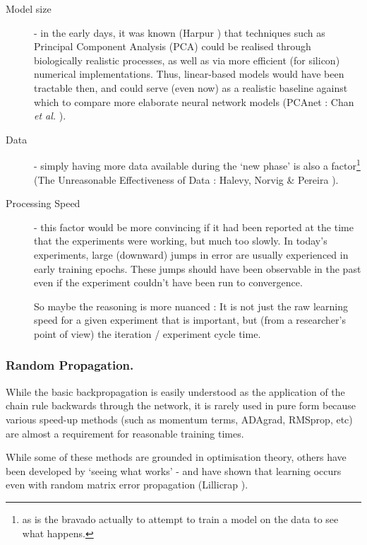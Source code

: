 \documentclass[citeauthoryear]{llncs}
\begin{document}
\begin{description}

\item[Model size] - in the early days, it was known (Harpur \cite{harpur-thesis}) 
that techniques such as Principal Component Analysis (PCA) could be realised  
through biologically realistic processes, as well as via more efficient (for silicon) numerical implementations.  
Thus, linear-based models would have been tractable then, 
and could serve (even now) as a realistic baseline against which to compare 
more elaborate neural network models (PCAnet : Chan \emph{et al.} \cite{PCAnet}).

\item[Data] - simply having more data available during the `new phase' 
is also a factor\footnote{as is the bravado actually to attempt to train a model on the data to see what happens.}
(The Unreasonable Effectiveness of Data : Halevy, Norvig \& Pereira \cite{norvig-UnreasonableEffectivenessOfData}).

\item[Processing Speed] - this factor would be more convincing if it had been reported at the time 
that the experiments were working, but much too slowly.  
In today's experiments, large (downward) jumps in error are usually experienced in early training epochs.  
These jumps should have been observable in the past 
even if the experiment couldn't have been run to convergence.  

So maybe the reasoning is more nuanced : It is not just the raw learning speed 
for a given experiment that is important, but 
(from a researcher's point of view) the iteration / experiment cycle time.

\end{description}


\subsubsection*{Random Propagation.}

While the basic backpropagation is easily understood as the application 
of the chain rule backwards through the network, it is rarely used in pure form
because various speed-up methods (such as momentum terms, ADAgrad, RMSprop, etc)
are almost a requirement for reasonable training times.  

While some of these methods are grounded in optimisation theory, 
others have been developed by `seeing what works' - and have shown that 
learning occurs even with random matrix error propagation 
(Lillicrap \cite{Lillicrap-random-matrix}).  
\end{document}
